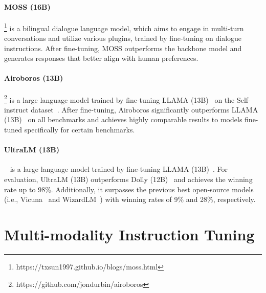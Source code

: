 \documentclass[11pt]{article}
\begin{document}
\paragraph{MOSS (16B)}\footnote{https://txsun1997.github.io/blogs/moss.html} is a bilingual dialogue language model, which aims to engage in multi-turn conversations and utilize various plugins, trained by fine-tuning on dialogue instructions. After fine-tuning, MOSS outperforms the backbone model and generates responses that better align with human preferences.

\paragraph{Airoboros (13B)}\footnote{https://github.com/jondurbin/airoboros} is a large language model trained by fine-tuning LLAMA (13B)~\citep{Touvron2023LLaMAOA} on the Self-instruct dataset~\citep{wang2022self}. After fine-tuning, Airoboros significantly outperforms LLAMA (13B)~\citep{Touvron2023LLaMAOA} on all benchmarks and achieves highly comparable results to models fine-tuned specifically for certain benchmarks.

\paragraph{UltraLM (13B)}~\citep{ding2023enhancing} is a large language model trained by  fine-tuning LLAMA (13B)~\citep{Touvron2023LLaMAOA}. For evaluation, UltraLM (13B) outperforms Dolly (12B)~\citep{conover2023free} and achieves the winning rate up to 98\%. Additionally, it surpasses the previous best open-source models (i.e., Vicuna~\citep{chiang2023vicuna} and WizardLM~\citep{xu2023wizardlm}) with winning rates of 9\% and 28\%, respectively.




\section{Multi-modality Instruction Tuning} \label{sec:Multi-modality_Instruction_Fine-tuning}
\end{document}
